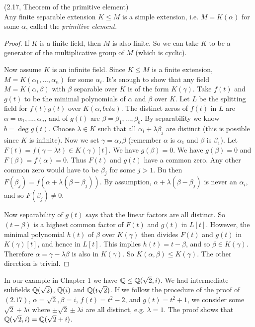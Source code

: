 \documentclass[a4paper]{article}
\begin{document}
\begin{thm} (2.17, Theorem of the primitive element)\\
Any finite separable extension $K \leq M$ is a simple extension, i.e. $M = K(\alpha)$ for some $\alpha$, called the \emph{primitive element}.

\begin{proof}
If $K$ is a finite field, then $M$ is also finite. So we can take $K$ to be a generator of the multiplicative group of $M$ (which is cyclic).

Now assume $K$ is an infinite field. Since $K \leq M$ is a finite extension, $M = K(\alpha_1,...,\alpha_n)$ for some $\alpha_i$. It's enough to show that any field $M=K(\alpha,\beta)$ with $\beta$ separable over $K$ is of the form $K(\gamma)$. Take $f(t)$ and $g(t)$ to be the minimal polynomials of $\alpha$ and $\beta$ over $K$. Let $L$ be the splitting field for $f(t) g(t)$ over $K(\alpha,beta)$. The distinct zeros of $f(t)$ in $L$ are $\alpha = \alpha_1,...,\alpha_a$, and of $g(t)$ are $\beta = \beta_1,...,\beta_b$. By separability we know $b = \deg g(t)$. Choose $\lambda \in K$ such that all $\alpha_i + \lambda \beta_j$ are distinct (this is possible since $K$ is infinite). Now we set $\gamma = \alpha_\lambda\beta$ (remember $\alpha$ is $\alpha_1$ and $\beta$ is $\beta_1$). Let $F(t) = f (\gamma -\lambda t) \in K(\gamma)[t]$. We have $g(\beta) = 0$. We have $g(\beta) =0 $ and $F(\beta) = f(\alpha)=0$. Thus $F(t)$ and $g(t)$ have a common zero. Any other common zero would have to be $\beta_j$ for some $j>1$. Bu then $F(\beta_j) = f(\alpha+\lambda(\beta-\beta_j))$. By assumption, $\alpha+\lambda(\beta-\beta_j)$ is never an $\alpha_i$, and so $F(\beta_j) \neq 0$.

Now separability of $g(t)$ says that the linear factors are all distinct. So $(t-\beta)$ is a highest common factor of $F(t)$ and $g(t)$ in $L[t]$. However, the minimal polynomial $h(t)$ of $\beta$ over $K(\gamma)$ then divides $F(t)$ and $g(t)$ in $K(\gamma)[t]$, and hence in $L[t]$. This implies $h(t) = t-\beta$, and so $\beta \in K(\gamma)$. Therefore $\alpha = \gamma - \lambda \beta$ is also in $K(\gamma)$. So $K(\alpha,\beta) \leq K(\gamma)$. The other direction is trivial.
\end{proof}
\end{thm}

\begin{eg}
In our example in Chapter 1 we have $\mathbb{Q} \leq \mathbb{Q}(\sqrt{2},i)$. We had intermediate subfields $\mathbb{Q}(\sqrt{2})$, $\mathbb{Q}(i)$ and $\mathbb{Q}(i\sqrt{2})$. If we follow the procedure of the proof of $(2.17)$, $\alpha = \sqrt{2},\beta = i$, $f(t) = t^2-2$, and $g(t) = t^2+1$, we consider some $\sqrt{2}+\lambda i$ where $\pm \sqrt{2} \pm \lambda i$ are all distinct, e.g. $\lambda=1$. The proof shows that $\mathbb{Q}(\sqrt{2},i) =\mathbb{Q}(\sqrt{2}+i)$.

\end{eg}
\end{document}
